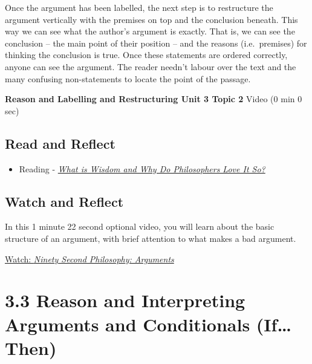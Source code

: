 \documentclass[
]{book}
\providecommand{\tightlist}{%
  \setlength{\itemsep}{0pt}\setlength{\parskip}{0pt}}
\begin{document}
Once the argument has been labelled, the next step is to restructure the argument vertically with the premises on top and the conclusion beneath. This way we can see what the author's argument is exactly. That is, we can see the conclusion -- the main point of their position -- and the reasons (i.e.~premises) for thinking the conclusion is true. Once these statements are ordered correctly, anyone can see the argument. The reader needn't labour over the text and the many confusing non-statements to locate the point of the passage.

\textbf{Reason and Labelling and Restructuring Unit 3 Topic 2} Video (0 min 0 sec)

\hypertarget{read-and-reflect-8}{%
\subsection*{Read and Reflect}\label{read-and-reflect-8}}

\begin{itemize}
\tightlist
\item
  Reading - \href{assets/u1/PHIL-100-Nozick-What-is-Wisdom.pdf}{\emph{What is Wisdom and Why Do Philosophers Love It So?}}
\end{itemize}

\hypertarget{watch-and-reflect-19}{%
\subsection*{Watch and Reflect}\label{watch-and-reflect-19}}

\begin{reflect}
In this 1 minute 22 second optional video, you will learn about the basic structure of an argument, with brief attention to what makes a bad argument.

\href{https://www.youtube.com/watch?v=Z7f_uuy1JcM}{Watch: \emph{Ninety Second Philosophy: Arguments}}
\end{reflect}

\hypertarget{reason-and-interpreting-arguments-and-conditionals-ifthen}{%
\section*{3.3 Reason and Interpreting Arguments and Conditionals (If\ldots Then)}\label{reason-and-interpreting-arguments-and-conditionals-ifthen}}
\end{document}
